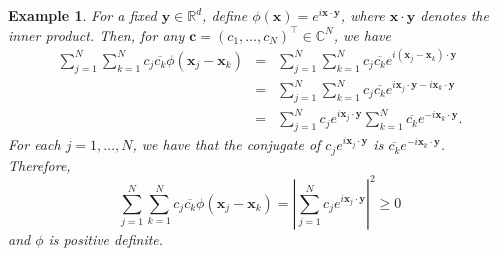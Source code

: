 \documentclass[12pt]{report} %
\newtheorem{example}{Example}
\newcommand{\tmmathbf}[1]{\ensuremath{\boldsymbol{#1}}}
\begin{document}
\begin{example}
  \label{funexampleutil}For a fixed $\tmmathbf{y} \in \mathbb{R}^d$, define
  $\phi (\tmmathbf{x}) = e^{i\tmmathbf{x} \cdot \tmmathbf{y}}$, where
  $\tmmathbf{x} \cdot \tmmathbf{y}$ denotes the inner product. Then, for any
  $\tmmathbf{c}= (c_1, \ldots, c_N)^{\top} \in \mathbb{C}^N$, we have
  \[ \begin{array}{ccc}
       \sum_{j = 1}^N \sum_{k = 1}^N c_j \overline{c_k} \phi (\tmmathbf{x}_j
       -\tmmathbf{x}_k) & = & \sum_{j = 1}^N \sum_{k = 1}^N c_j \overline{c_k}
       e^{i (\tmmathbf{x}_j -\tmmathbf{x}_k) \cdot \tmmathbf{y}}\\
       & = & \sum_{j = 1}^N \sum_{k = 1}^N c_j \overline{c_k}
       e^{i\tmmathbf{x}_j \cdot \tmmathbf{y}- i\tmmathbf{x}_k \cdot
       \tmmathbf{y}}\\
       & = & \sum_{j = 1}^N c_j e^{i\tmmathbf{x}_j \cdot \tmmathbf{y}}
       \sum_{k = 1}^N \overline{c_k} e^{- i\tmmathbf{x}_k \cdot \tmmathbf{y}}
       .
     \end{array} \]
  For each $j = 1, \ldots, N$, we have that the conjugate of $c_j
  e^{i\tmmathbf{x}_j \cdot \tmmathbf{y}}$ is $\overline{c_k} e^{-
  i\tmmathbf{x}_k \cdot \tmmathbf{y}}$. Therefore,
  \begin{equation}
    \sum_{j = 1}^N \sum_{k = 1}^N c_j \overline{c_k} \phi (\tmmathbf{x}_j
    -\tmmathbf{x}_k) = \left| \sum_{j = 1}^N c_j e^{i\tmmathbf{x}_j \cdot
    \tmmathbf{y}} \right|^2 \geq 0 \label{positivedefinitepropertyasmodulus}
  \end{equation}
  and $\phi$ is positive definite.
\end{example}
\end{document}
